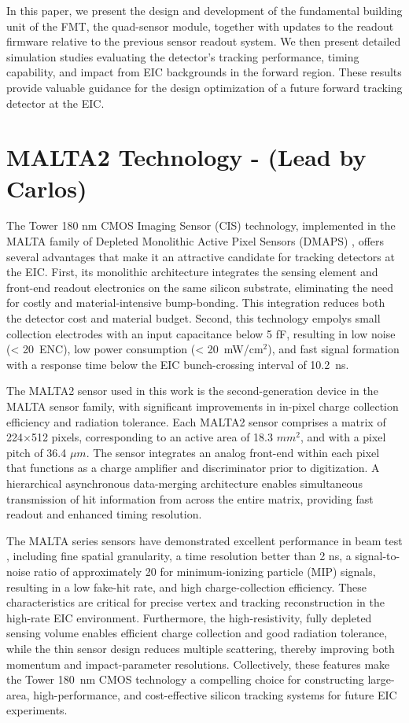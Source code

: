 \documentclass[pdftex,twocolumn,epjc3]{svjour3}          %
\begin{document}
In this paper, we present the design and development of the fundamental building unit of the FMT, the quad-sensor module, together with updates to the readout firmware relative to the previous sensor readout system. We then present detailed simulation studies evaluating the detector's tracking performance, timing capability, and impact from EIC backgrounds in the forward region. These results provide valuable guidance for the design optimization of a future forward tracking detector at the EIC. 

\section{MALTA2 Technology - (Lead by Carlos)}\label{sec:tech}

The Tower 180 nm CMOS Imaging Sensor (CIS) technology, implemented in the MALTA family of Depleted Monolithic Active Pixel Sensors (DMAPS) \cite{MALTACz,MALTA2Cz}, offers several advantages that make it an attractive candidate for tracking detectors at the EIC. First, its monolithic architecture integrates the sensing element and front-end readout electronics on the same silicon substrate, eliminating the need for costly and material-intensive bump-bonding. This integration reduces both the detector cost and material budget. Second, this technology empolys small collection electrodes with an input capacitance below 5 fF, resulting in low noise (< 20~ENC), low power consumption (< 20~mW/cm$^2$), and fast signal formation with a response time below the EIC bunch-crossing interval of 10.2~ns. 

The MALTA2 sensor used in this work is the second-generation device in the MALTA sensor family, with significant improvements in in-pixel charge collection efficiency and radiation tolerance. Each MALTA2 sensor comprises a matrix of 224$\times$512 pixels, corresponding to an active area of 18.3 $mm^{2}$, and with a pixel pitch of 36.4 $\mu m$. The sensor integrates an analog front-end within each pixel that functions as a charge amplifier and discriminator prior to digitization. A hierarchical asynchronous data-merging architecture enables simultaneous transmission of hit information from across the entire matrix, providing fast readout and enhanced timing resolution.

The MALTA series sensors have demonstrated excellent performance in beam test \cite{MALTATelescope}, including fine spatial granularity, a time resolution better than 2 ns, a signal-to-noise ratio of approximately 20 for minimum-ionizing particle (MIP) signals, resulting in a low fake-hit rate, and high charge-collection efficiency. These characteristics are critical for precise vertex and tracking reconstruction in the high-rate EIC environment. Furthermore, the high-resistivity, fully depleted sensing volume enables efficient charge collection and good radiation tolerance, while the thin sensor design reduces multiple scattering, thereby improving both momentum and impact-parameter resolutions. Collectively, these features make the Tower 180~nm CMOS technology a compelling choice for constructing large-area, high-performance, and cost-effective silicon tracking systems for future EIC experiments.
\end{document}

